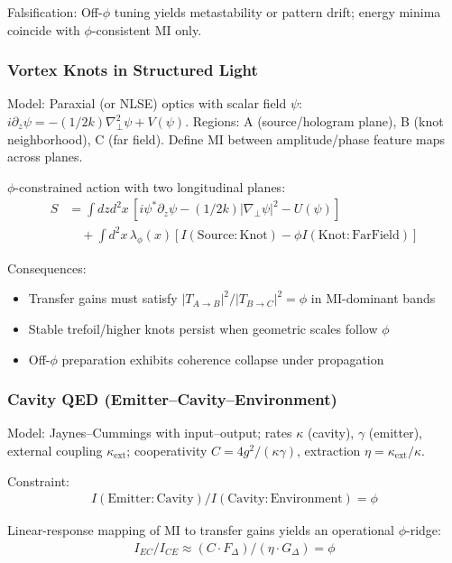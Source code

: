 \documentclass[11pt]{article}
\theoremstyle{definition}
\newcommand{\goldenratio}{\phi}
\begin{document}
Falsification: Off-$\goldenratio$ tuning yields metastability or pattern drift; energy minima coincide with $\goldenratio$-consistent MI only.

\subsubsection{Vortex Knots in Structured Light}

Model: Paraxial (or NLSE) optics with scalar field $\psi$: $i\partial_z \psi = -(1/2k)\nabla_\perp^2\psi + V(\psi)$. Regions: A (source/hologram plane), B (knot neighborhood), C (far field). Define MI between amplitude/phase feature maps across planes.

$\goldenratio$-constrained action with two longitudinal planes:
\begin{align}
S &= \int dz d^2x \, [i \psi^*\partial_z\psi - (1/2k)|\nabla_\perp\psi|^2 - U(\psi)] \\
&\quad + \int d^2x \, \lambda_\goldenratio(x) [I(\text{Source}:\text{Knot}) - \goldenratio I(\text{Knot}:\text{FarField})]
\end{align}

Consequences:
\begin{itemize}
\item Transfer gains must satisfy $|T_{A \to B}|^2 / |T_{B \to C}|^2 = \goldenratio$ in MI-dominant bands
\item Stable trefoil/higher knots persist when geometric scales follow $\goldenratio$
\item Off-$\goldenratio$ preparation exhibits coherence collapse under propagation
\end{itemize}

\subsubsection{Cavity QED (Emitter–Cavity–Environment)}

Model: Jaynes–Cummings with input–output; rates $\kappa$ (cavity), $\gamma$ (emitter), external coupling $\kappa_{\text{ext}}$; cooperativity $C = 4g^2/(\kappa\gamma)$, extraction $\eta = \kappa_{\text{ext}}/\kappa$.

Constraint:
\begin{align}
I(\text{Emitter}:\text{Cavity}) / I(\text{Cavity}:\text{Environment}) = \goldenratio
\end{align}

Linear-response mapping of MI to transfer gains yields an operational $\goldenratio$-ridge:
\begin{align}
I_{EC} / I_{CE} \approx (C \cdot F_\Delta) / (\eta \cdot G_\Delta) = \goldenratio
\end{align}
\end{document}
